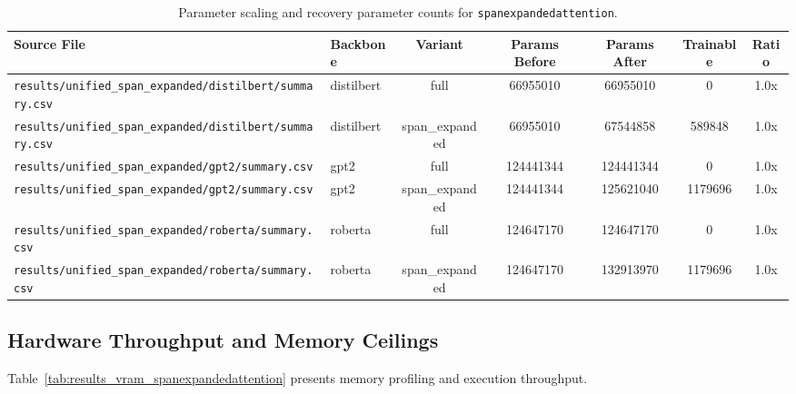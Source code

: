 \begin{table}[t]
\centering
\small
\begin{tabular}{llccccc}
\toprule
\textbf{Source File} & \textbf{Backbone} & \textbf{Variant} & \textbf{Params Before} & \textbf{Params After} & \textbf{Trainable} & \textbf{Ratio} \\
\midrule
\texttt{results/unified\_span\_expanded/distilbert/summary.csv} & distilbert & full & 66955010 & 66955010 & 0 & 1.0x \\
\texttt{results/unified\_span\_expanded/distilbert/summary.csv} & distilbert & span\_expanded & 66955010 & 67544858 & 589848 & 1.0x \\
\texttt{results/unified\_span\_expanded/gpt2/summary.csv} & gpt2 & full & 124441344 & 124441344 & 0 & 1.0x \\
\texttt{results/unified\_span\_expanded/gpt2/summary.csv} & gpt2 & span\_expanded & 124441344 & 125621040 & 1179696 & 1.0x \\
\texttt{results/unified\_span\_expanded/roberta/summary.csv} & roberta & full & 124647170 & 124647170 & 0 & 1.0x \\
\texttt{results/unified\_span\_expanded/roberta/summary.csv} & roberta & span\_expanded & 124647170 & 132913970 & 1179696 & 1.0x \\
\bottomrule
\end{tabular}
\caption{Parameter scaling and recovery parameter counts for \texttt{spanexpandedattention}.}
\label{tab:results_params_spanexpandedattention}
\end{table}

\subsection{Hardware Throughput and Memory Ceilings}
Table~\ref{tab:results_vram_spanexpandedattention} presents memory profiling and execution throughput.

